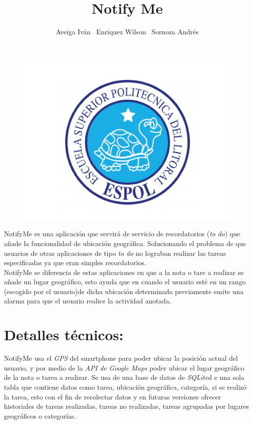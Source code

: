 \documentclass[a4paper,11pt]{article}
\begin{document}
	\author{
	Aveiga Iván \ Enriquez Wilson \ Sornoza Andrés
	}
\title{Notify Me}
\maketitle
\begin{figure}[h]
\centering
\includegraphics[width=0.7\linewidth]{./logo}
\end{figure}



\vspace{7mm}

NotifyMe es una aplicación que servirá de servicio de recordatorios (\emph{to do}) que añade la funcionalidad de ubicación geográfica. Solucionando el problema de que usuarios de otras aplicaciones de tipo \emph{to do} no lograban realizar las tareas especificadas ya que eran simples recordatorios. \\

NotifyMe se diferencia de estas aplicaciones en que a la nota o tare a realizar se añade un lugar geográfico, esto ayuda que en cuando el usuario esté en un rango (escogido por el usuario)de dicha ubicación determinada previamente emite una alarma para que el usuario realice la actividad anotada.

\section{\textbf{Detalles técnicos:}}

NotifyMe usa el \emph{GPS} del smartphone para poder ubicar la posición actual del usuario, y por medio de la \emph{API de Google Maps} poder ubicar el lugar geográfico de la nota o tarea a realizar. Se usa de una base de datos de \emph{SQLite}d e una sola tabla que contiene datos como tarea, ubicación geográfica, categoría, si se realizó la tarea, esto con el fin de recolectar datos y en futuras versiones ofrecer historiales de tareas realizadas, tareas no realizadas, tareas agrupadas por lugares geográficos o categorías. \\
 
\end{document}
